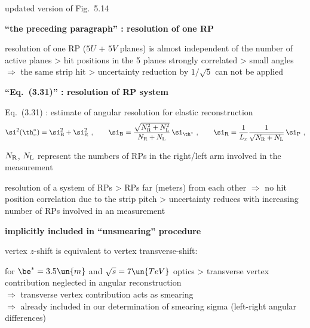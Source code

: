 \> updated version of Fig.~5.14


\newpage%


\centerline{\bf ``the preceding paragraph'' : resolution of one RP}

\> resolution of one RP ($5U$ + $5V$ planes) is almost independent of the number of active planes
\>> hit positions in the 5 planes strongly correlated
\>> small angles $\Rightarrow$ the same strip hit
\>> uncertainty reduction by $1/\sqrt5$ can not be applied

\vfil
\centerline{\bf ``Eq.~(3.31)'' : resolution of RP system}

\> Eq.~(3.31) : estimate of angular resolution for elastic reconstruction
$$
	\si^2(\th_x^*) =  \si_{\rm B}^2 + \si_{\rm R}^2\ ,\qquad
	\si_{\rm B} = {\sqrt{N_{\rm R}^2 + N_{\rm L}^2} \over N_{\rm R} + N_{\rm L}}\, \si_{\th^*}\ ,\qquad
	\si_{\rm R} = {1\over L_x} {1\over \sqrt{N_{\rm R} + N_{\rm L}}}\, \si_{\rm P}\ ,
$$

\> $N_{\rm R}$, $N_{\rm L}$ represent the numbers of RPs in the right/left arm involved in the measurement

\> resolution of a system of RPs
\>> RPs far (meters) from each other $\Rightarrow$ no hit position correlation due to the strip pitch
\>> uncertainty reduces with increasing number of RPs involved in an measurement



\newpage%
\vskip2mm

\centerline{\bf implicitly included in ``unsmearing'' procedure}

\> vertex $z$-shift is equivalent to vertex transverse-shift:


\> for $\be^* = 3.5\un{m}$ and $\sqrt s = 7\un{TeV}$ optics
\>> transverse vertex contribution neglected in angular reconstruction\\
$\Rightarrow$ transverse vertex contribution acts as smearing\\
$\Rightarrow$ already included in our determination of smearing sigma (left-right angular differences)


